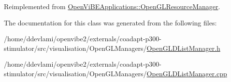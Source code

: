 Reimplemented from \hyperlink{classOpenViBEApplications_1_1OpenGLResourceManager_a5dfc8286721f8ec13adc4a0f7209e3e4}{OpenViBEApplications::OpenGLResourceManager}.



The documentation for this class was generated from the following files:\begin{DoxyCompactItemize}
\item 
/home/ddevlami/openvibe2/externals/coadapt-\/p300-\/stimulator/src/visualisation/OpenGLManagers/\hyperlink{OpenGLDListManager_8h}{OpenGLDListManager.h}\item 
/home/ddevlami/openvibe2/externals/coadapt-\/p300-\/stimulator/src/visualisation/OpenGLManagers/\hyperlink{OpenGLDListManager_8cpp}{OpenGLDListManager.cpp}\end{DoxyCompactItemize}
